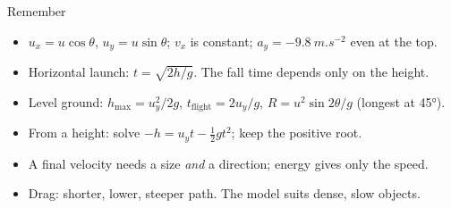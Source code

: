 \begin{summarybox}{Remember}
\begin{itemize}
  \item $u_x = u\cos\theta$, $u_y = u\sin\theta$; $v_x$ is constant; $a_y = \qty{-9.8}{m.s^{-2}}$ even
        at the top.
  \item Horizontal launch: $t = \sqrt{2h/g}$. The fall time depends only on the height.
  \item Level ground: $h_\mathrm{max} = u_y^2/2g$, $t_\mathrm{flight} = 2u_y/g$,
        $R = u^2\sin 2\theta/g$ (longest at \ang{45}).
  \item From a height: solve $-h = u_y t - \tfrac{1}{2}gt^2$; keep the positive root.
  \item A final velocity needs a size \emph{and} a direction; energy gives only the speed.
  \item Drag: shorter, lower, steeper path. The model suits dense, slow objects.
\end{itemize}
\end{summarybox}
